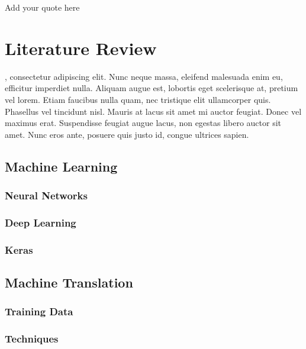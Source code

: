 \begin{savequote}[75mm]
Add your quote here
\end{savequote}

\chapter{Literature Review}
\label{literature}
, consectetur adipiscing elit. Nunc neque massa, eleifend malesuada enim eu, efficitur imperdiet nulla. Aliquam augue est, lobortis eget scelerisque at, pretium vel lorem. Etiam faucibus nulla quam, nec tristique elit ullamcorper quis. Phasellus vel tincidunt nisl. Mauris at lacus sit amet mi auctor feugiat. Donec vel maximus erat. Suspendisse feugiat augue lacus, non egestas libero auctor sit amet. Nunc eros ante, posuere quis justo id, congue ultrices sapien.

\clearpage


\section{Machine Learning}


\subsection{Neural Networks}


\subsection{Deep Learning}



\subsection{Keras}




\section{Machine Translation}
\label{Machine Translation}


\subsection{Training Data}


\subsection{Techniques}

